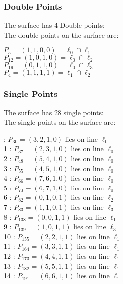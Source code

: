 \documentclass{article}
\begin{document}
{\subsubsection*{Double Points}
The surface has 4 Double points:\\
The double points on the surface are:\\
\begin{multicols}{2}
\noindent
$P_{5} = ( 1, 1, 0, 0 ) = \ell_{0} \cap \ell_{1} $\\
$P_{12} = ( 1, 0, 1, 0 ) = \ell_{0} \cap \ell_{2} $\\
$P_{19} = ( 0, 1, 1, 0 ) = \ell_{0} \cap \ell_{3} $\\
$P_{4} = ( 1, 1, 1, 1 ) = \ell_{1} \cap \ell_{2} $\\
\end{multicols}
\subsubsection*{Single Points}
The surface has 28 single points:\\
The single points on the surface are:\\
\begin{multicols}{2}
 : $P_{30}=( 3, 2, 1, 0 )$ lies on line $\ell_{0}$\\
1 : $P_{37}=( 2, 3, 1, 0 )$ lies on line $\ell_{0}$\\
2 : $P_{48}=( 5, 4, 1, 0 )$ lies on line $\ell_{0}$\\
3 : $P_{55}=( 4, 5, 1, 0 )$ lies on line $\ell_{0}$\\
4 : $P_{66}=( 7, 6, 1, 0 )$ lies on line $\ell_{0}$\\
5 : $P_{73}=( 6, 7, 1, 0 )$ lies on line $\ell_{0}$\\
6 : $P_{82}=( 0, 1, 0, 1 )$ lies on line $\ell_{2}$\\
7 : $P_{83}=( 1, 1, 0, 1 )$ lies on line $\ell_{3}$\\
8 : $P_{138}=( 0, 0, 1, 1 )$ lies on line $\ell_{1}$\\
9 : $P_{139}=( 1, 0, 1, 1 )$ lies on line $\ell_{3}$\\
10 : $P_{155}=( 2, 2, 1, 1 )$ lies on line $\ell_{1}$\\
11 : $P_{164}=( 3, 3, 1, 1 )$ lies on line $\ell_{1}$\\
12 : $P_{173}=( 4, 4, 1, 1 )$ lies on line $\ell_{1}$\\
13 : $P_{182}=( 5, 5, 1, 1 )$ lies on line $\ell_{1}$\\
14 : $P_{191}=( 6, 6, 1, 1 )$ lies on line $\ell_{1}$\\

\end{multicols}}
\end{document}
